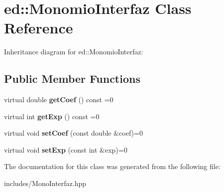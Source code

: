 \hypertarget{classed_1_1MonomioInterfaz}{}\section{ed\+:\+:Monomio\+Interfaz Class Reference}
\label{classed_1_1MonomioInterfaz}


Inheritance diagram for ed\+:\+:Monomio\+Interfaz\+:
\subsection*{Public Member Functions}
\begin{DoxyCompactItemize}
\item 
\hypertarget{classed_1_1MonomioInterfaz_a191293ddb686000ee4bb4b14e2b946fb}{}virtual double {\bfseries get\+Coef} () const =0\label{classed_1_1MonomioInterfaz_a191293ddb686000ee4bb4b14e2b946fb}

\item 
\hypertarget{classed_1_1MonomioInterfaz_a38193d71bd557347926de88aacb6677e}{}virtual int {\bfseries get\+Exp} () const =0\label{classed_1_1MonomioInterfaz_a38193d71bd557347926de88aacb6677e}

\item 
\hypertarget{classed_1_1MonomioInterfaz_abd48a0f5c37606448e1c099f39d32a1b}{}virtual void {\bfseries set\+Coef} (const double \&coef)=0\label{classed_1_1MonomioInterfaz_abd48a0f5c37606448e1c099f39d32a1b}

\item 
\hypertarget{classed_1_1MonomioInterfaz_ae528cf7e978aa7299933e8f58a286bc0}{}virtual void {\bfseries set\+Exp} (const int \&exp)=0\label{classed_1_1MonomioInterfaz_ae528cf7e978aa7299933e8f58a286bc0}

\end{DoxyCompactItemize}


The documentation for this class was generated from the following file\+:\begin{DoxyCompactItemize}
\item 
includes/Mono\+Interfaz.\+hpp\end{DoxyCompactItemize}
